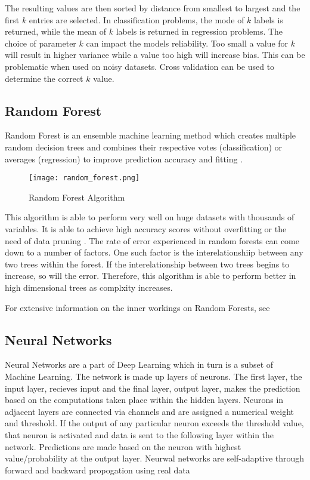 The resulting values are then sorted by distance from smallest to largest and the first $k$ entries are selected. 
In classification problems, the mode of $k$ labels is returned, while the mean of $k$ labels is returned in regression problems.
The choice of parameter $k$ can impact the models reliability. Too small a value for $k$ will result in higher variance while a value too high will increase bias. 
This can be problematic when used on noisy datasets. Cross validation can be used to determine the correct $k$ value.

\subsection{Random Forest}
Random Forest is an ensemble machine learning method which creates multiple random decision trees and combines their respective votes (classification) or averages (regression) to improve prediction accuracy and fitting \cite{rf}.

\begin{figure}[h]
    \texttt{[image: random\_forest.png]}
    \centering
    \caption{Random Forest Algorithm \cite{rf}}
    \label{fig:RF}
\end{figure}

This algorithm is able to perform very well on huge datasets with thousands of variables. 
It is able to achieve high accuracy scores without overfitting or the need of data pruning \cite{8074494}.
The rate of error experienced in random forests can come down to a number of factors.
One such factor is the interelationshiip between any two trees within the forest. 
If the interelationship between two trees begins to increase, so will the error.
Therefore, this algorithm is able to perform better in high dimensional trees as complxity increases.
 
For extensive information on the inner workings on Random Forests, see \cite{10.5555/2503308.2343682}

\subsection{Neural Networks}
Neural Networks are a part of Deep Learning which in turn is a subset of Machine Learning.
The network is made up layers of neurons.
The first layer, the input layer, recieves input and the final layer, output layer, makes the prediction based on the computations taken place within the hidden layers.
Neurons in adjacent layers are connected via channels and are assigned a numerical weight and threshold.
If the output of any particular neuron exceeds the threshold value, that neuron is activated and data is sent to the following layer within the network.
Predictions are made based on the neuron with highest value/probability at the output layer. 
Neurwal networks are self-adaptive through forward and backward propogation using real data

